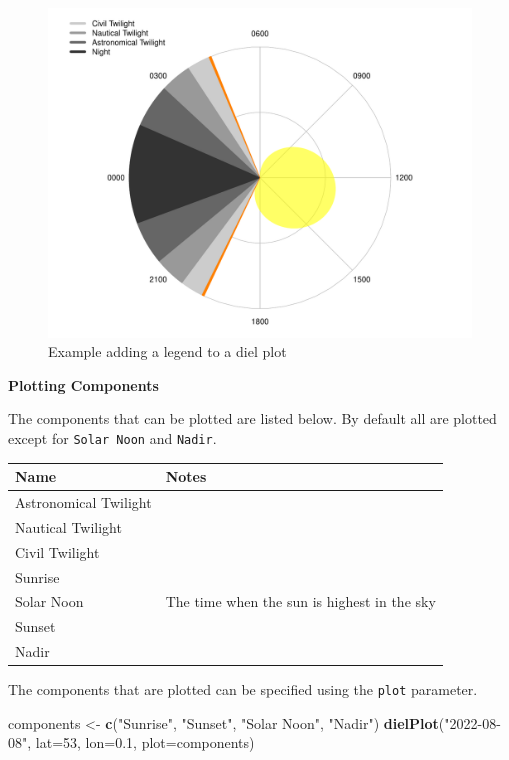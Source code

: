 \documentclass[
]{book}
\newenvironment{Shaded}{\begin{snugshade}}{\end{snugshade}}
\newcommand{\AttributeTok}[1]{\textcolor[rgb]{0.13,0.29,0.53}{#1}}
\newcommand{\DecValTok}[1]{\textcolor[rgb]{0.00,0.00,0.81}{#1}}
\newcommand{\FloatTok}[1]{\textcolor[rgb]{0.00,0.00,0.81}{#1}}
\newcommand{\FunctionTok}[1]{\textcolor[rgb]{0.13,0.29,0.53}{\textbf{#1}}}
\newcommand{\NormalTok}[1]{#1}
\newcommand{\OtherTok}[1]{\textcolor[rgb]{0.56,0.35,0.01}{#1}}
\newcommand{\StringTok}[1]{\textcolor[rgb]{0.31,0.60,0.02}{#1}}
\begin{document}
\begin{figure}

{\centering \includegraphics[width=0.9\linewidth]{_main_files/figure-latex/diel-plot-legend-1} 

}

\caption{Example adding a legend to a diel plot}\label{fig:diel-plot-legend}
\end{figure}

\textbf{Plotting Components}

The components that can be plotted are listed below. By default all are plotted except for \texttt{Solar\ Noon} and \texttt{Nadir}.

\begin{longtable}[]{@{}ll@{}}
\toprule\noalign{}
Name & Notes \\
\midrule\noalign{}
\endhead
\bottomrule\noalign{}
\endlastfoot
Astronomical Twilight & \\
Nautical Twilight & \\
Civil Twilight & \\
Sunrise & \\
Solar Noon & The time when the sun is highest in the sky \\
Sunset & \\
Nadir & \\
\end{longtable}

The components that are plotted can be specified using the \texttt{plot} parameter.

\begin{Shaded}
\begin{Highlighting}[]
\NormalTok{components }\OtherTok{\textless{}{-}} \FunctionTok{c}\NormalTok{(}\StringTok{"Sunrise"}\NormalTok{, }\StringTok{"Sunset"}\NormalTok{, }\StringTok{"Solar Noon"}\NormalTok{, }\StringTok{"Nadir"}\NormalTok{)}
\FunctionTok{dielPlot}\NormalTok{(}\StringTok{"2022{-}08{-}08"}\NormalTok{, }\AttributeTok{lat=}\DecValTok{53}\NormalTok{, }\AttributeTok{lon=}\FloatTok{0.1}\NormalTok{, }\AttributeTok{plot=}\NormalTok{components)}
\end{Highlighting}
\end{Shaded}
\end{document}
